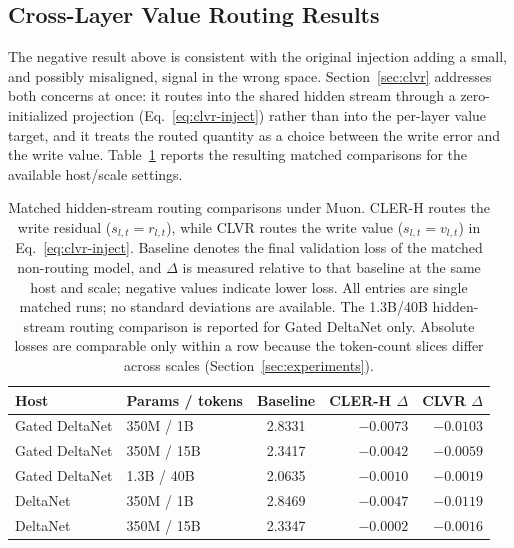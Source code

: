 \documentclass{article}
\begin{document}
\subsection{Cross-Layer Value Routing Results}
\label{sec:clvr-results}

The negative result above is consistent with the original injection adding a small, and possibly misaligned, signal in the wrong space. Section~\ref{sec:clvr} addresses both concerns at once: it routes into the shared hidden stream through a zero-initialized projection (Eq.~\eqref{eq:clvr-inject}) rather than into the per-layer value target, and it treats the routed quantity as a choice between the write error and the write value. Table~\ref{tab:clvr-results} reports the resulting matched comparisons for the available host/scale settings.


\begin{table}[tbp]
    \centering
    \caption{Matched hidden-stream routing comparisons under Muon. CLER-H routes the write residual ($s_{l,t}=r_{l,t}$), while CLVR routes the write value ($s_{l,t}=v_{l,t}$) in Eq.~\eqref{eq:clvr-inject}. Baseline denotes the final validation loss of the matched non-routing model, and $\Delta$ is measured relative to that baseline at the same host and scale; negative values indicate lower loss. All entries are single matched runs; no standard deviations are available. The 1.3B/40B hidden-stream routing comparison is reported for Gated DeltaNet only. Absolute losses are comparable only within a row because the token-count slices differ across scales (Section~\ref{sec:experiments}).}

    \label{tab:clvr-results}
    \begin{tabular}{llcrr}
        \toprule
        Host & Params / tokens & Baseline & CLER-H $\Delta$ & CLVR $\Delta$ \\
        \midrule
        Gated DeltaNet & 350M / 1B  & 2.8331 & $-0.0073$ & $\mathbf{-0.0103}$ \\
        Gated DeltaNet & 350M / 15B & 2.3417 & $-0.0042$ & $\mathbf{-0.0059}$ \\
        Gated DeltaNet & 1.3B / 40B & 2.0635 & $-0.0010$ & $\mathbf{-0.0019}$ \\
        DeltaNet       & 350M / 1B  & 2.8469 & $-0.0047$ & $\mathbf{-0.0119}$ \\
        DeltaNet       & 350M / 15B & 2.3347 & $-0.0002$ & $\mathbf{-0.0016}$ \\
        \bottomrule
    \end{tabular}
\end{table}
\end{document}
